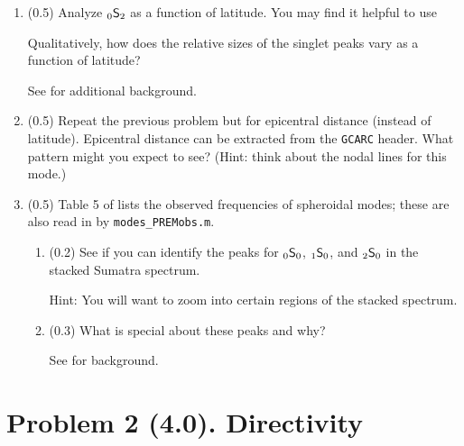 \documentclass[11pt,titlepage,fleqn]{article}
\newcommand{\snl}[2]{\mbox{$_{#1}\ssS_{#2}$}}
\begin{document}
\begin{enumerate}
\item (0.5) Analyze \snl{0}{2} as a function of latitude. You may find it helpful to use 

Qualitatively, how does the relative sizes of the singlet peaks vary as a function of latitude?

See \citet[][Figure 3]{SSteinOkal2007} for additional background.


\item (0.5) Repeat the previous problem but for epicentral distance (instead of latitude). Epicentral distance can be extracted from the \verb+GCARC+ header. What pattern might you expect to see? (Hint: think about the nodal lines for this mode.)


\item (0.5) Table 5 of \citet{PREM} lists the observed frequencies of spheroidal modes; these are also read in by \verb+modes_PREMobs.m+.
%
\begin{enumerate}
\item (0.2) See if you can identify the peaks for \snl{0}{0}, \snl{1}{0}, and \snl{2}{0} in the stacked Sumatra spectrum.

Hint: You will want to zoom into certain regions of the stacked spectrum.

\item (0.3) What is special about these peaks and why?

See \citet[][p. 106]{SteinWysession} for background.
\end{enumerate}

\end{enumerate}


\section*{Problem 2 (4.0). Directivity}
\end{document}
